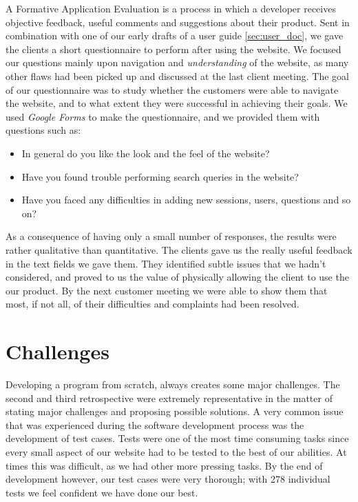 \documentclass{l3proj}
\begin{document}
A Formative Application Evaluation is a process in which a developer receives objective feedback, useful comments and suggestions about their product. Sent in combination with one of our early drafts of a user guide \autoref{sec:user_doc}, we gave the clients a short questionnaire to perform after using the website. We focused our questions mainly upon navigation and \textit{understanding} of the website, as many other flaws had been picked up and discussed at the last client meeting. The goal of our questionnaire was to study whether the customers were able to navigate the website, and to what extent they were successful in achieving their goals. We used \textit{Google Forms} to make the questionnaire, and we provided them with questions such as:
\begin{itemize}
 \item In general do you like the look and the feel of the website?
 \item Have you found trouble performing search queries in the website?
 \item Have you faced any difficulties in adding new sessions, users, questions and so on?
\end{itemize}

As a consequence of having only a small number of responses, the results were rather qualitative than quantitative. The clients gave us the really useful feedback in the text fields we gave them. They identified subtle issues that we hadn't considered, and proved to us the value of physically allowing the client to use the our product. By the next customer meeting we were able to show them that most, if not all, of their difficulties and complaints had been resolved.


\section{Challenges}
\label{challenges}

Developing a program from scratch, always creates some major challenges. The second and third retrospective were extremely representative in the matter of stating major challenges and proposing possible solutions. A very common issue that was experienced during the software development process was the development of test cases. Tests were one of the most time consuming tasks since every small aspect of our website had to be tested to the best of our abilities. At times this was difficult, as we had other more pressing tasks. By the end of development however, our test cases were very thorough; with 278 individual tests we feel confident we have done our best.
\end{document}

